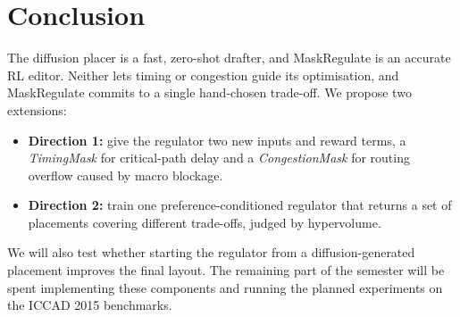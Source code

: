 \documentclass{article}
\begin{document}
\section{Conclusion}
The diffusion placer \citep{lee2025diffusion} is a fast, zero-shot drafter, and MaskRegulate
\citep{xue2024maskregulate} is an accurate RL editor. Neither lets timing or congestion guide its
optimisation, and MaskRegulate commits to a single hand-chosen trade-off. We propose two extensions:
\begin{itemize}
  \item \textbf{Direction 1:} give the regulator two new inputs and reward terms, a \emph{TimingMask}
  for critical-path delay and a \emph{CongestionMask} for routing overflow caused by macro blockage.
  \item \textbf{Direction 2:} train one preference-conditioned regulator that returns a set of
  placements covering different trade-offs, judged by hypervolume.
\end{itemize}
We will also test whether starting the regulator from a diffusion-generated placement improves the
final layout. The remaining part of the semester will be spent implementing these components and
running the planned experiments on the ICCAD 2015 benchmarks.



\end{document}

